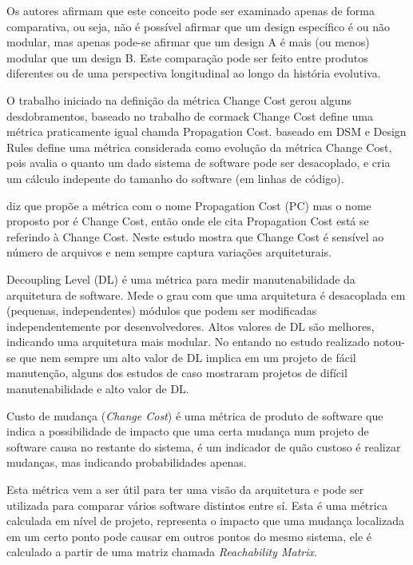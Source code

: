Os autores afirmam que este conceito pode ser examinado apenas de forma
comparativa, ou seja, não é possível afirmar que um design específico é ou não
modular, mas apenas pode-se afirmar que um design A é mais (ou menos) modular
que um design B. Este comparação pode ser feito entre produtos diferentes ou de
uma perspectiva longitudinal ao longo da história evolutiva.

O trabalho iniciado na definição da métrica Change Cost gerou alguns desdobramentos,
 baseado no trabalho de cormack Change Cost define uma métrica
praticamente igual chamda Propagation Cost.  baseado em DSM
e Design Rules\cite{Baldwin2000} define uma métrica considerada como evolução
da métrica Change Cost, pois avalia o quanto um dado sistema de software pode
ser desacoplado, e cria um cálculo indepente do tamanho do software (em linhas
de código).

\cite{Mo2016} diz que \cite{Maccormack2006} propõe a métrica com o nome
Propagation Cost (PC) mas o nome proposto por \cite{Maccormack2006} é Change
Cost, então onde ele cita Propagation Cost está se referindo à Change Cost.
Neste estudo \cite{Mo2016} mostra que Change Cost é sensível ao número de arquivos
e nem sempre captura variações arquiteturais.

Decoupling Level (DL) é uma métrica para medir manutenabilidade da arquitetura
de software. Mede o grau com que uma arquitetura é desacoplada em (pequenas,
independentes) módulos que podem ser modificadas independentemente por
desenvolvedores. Altos valores de DL são melhores, indicando uma arquitetura
mais modular. No entando no estudo realizado notou-se que nem sempre um alto
valor de DL implica em um projeto de fácil manutenção, alguns dos estudos de caso
mostraram projetos de difícil manutenabilidade e alto valor de DL.

Custo de mudança ({\it Change Cost})\cite{Maccormack2006} é uma métrica
de produto de software que indica a possibilidade de impacto que uma
certa mudança num projeto de software causa no restante do sistema, é
um indicador de quão custoso é realizar mudanças, mas indicando probabilidades
apenas.

Esta métrica vem a ser útil para ter uma visão da arquitetura e pode ser
utilizada para comparar vários software distintos entre sí. Esta é uma métrica
calculada em nível de projeto, representa o impacto que uma mudança localizada
em um certo ponto pode causar em outros pontos do mesmo sistema, ele é
calculado a partir de uma matriz chamada {\it Reachability Matrix}.

